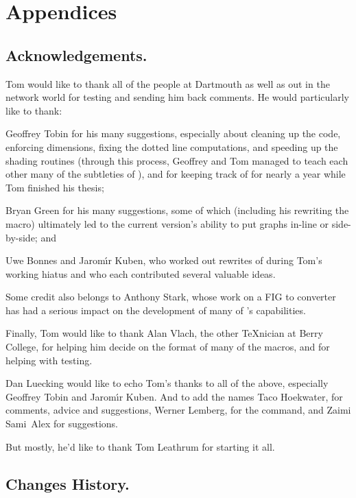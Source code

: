 \documentclass[letterpaper]{article}
\begin{document}
\chapter{Appendices}\label{appendices}

\section{Acknowledgements.}\label{acknowledgements}

Tom would like to thank all of the people at Dartmouth as well as out in
the network world for testing \mfp{} and sending him back
comments. He would particularly like to thank:

Geoffrey Tobin
for his many suggestions, especially about cleaning up the \MF{} code,
enforcing dimensions, fixing the dotted line computations, and speeding
up the shading routines (through this process, Geoffrey and Tom managed
to teach each other many of the subtleties of \MF{}), and for keeping
track of \mfp{} for nearly a year while Tom finished his thesis;

Bryan Green
for his many suggestions, some of which (including his rewriting the
 macro) ultimately led to the current version's ability to
put graphs in-line or side-by-side; and

Uwe Bonnes and
Jarom\'\i r Kuben,
who worked out rewrites of \mfp{} during Tom's working hiatus and who
each contributed several valuable ideas.

Some credit also belongs to
Anthony Stark,
whose work on a FIG to \MF{} converter has had a serious impact on the
development of many of \mfp{}'s capabilities.

Finally, Tom would like to thank
Alan Vlach,
the other \TeX{}nician at Berry College, for helping him decide on the
format of many of the macros, and for helping with testing.

\medskip
Dan Luecking would like to echo Tom's thanks to all of the above,
especially Geoffrey Tobin and Jarom\'\i r Kuben. And to add the names
Taco Hoekwater, for comments, advice and suggestions, Werner Lemberg,
for the  command, and Zaimi Sami~Alex for suggestions.

But mostly, he'd like to thank Tom Leathrum for starting it all.

\section{Changes History.}\label{changes}
\end{document}
